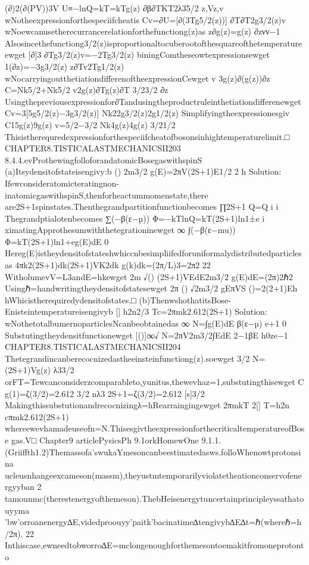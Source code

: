 {{{{{{{{{{{(∂)2(∂(PV))3V
U≡−lnQ=kT=kTg(z)
∂β∂TKT2λ35/2
z,Vz,v
wNotheexpressionforthespeciifcheatis
Cv=∂U=[∂(3Tg5/2(z))]
∂T∂T2g3/2(z)v
wNoewcanusetherecurrancerelationforthefunctiong(z)as
z∂g(z)=g(z)
∂zνν−1
Alsosincethefunctiong3/2(z)isproportionaltocuberootofthesquareofthetemperatureewget
[∂]3
∂Tg3/2(z)v=−2Tg3/2(z)
biningComtheseowtexpressionsewget
1(∂z)=−3g3/2(z)
z∂Tv2Tg1/2(z)
wNocarryingoutthetiationdifferenoftheexpressionCewget
v
3g(z)∂(g(z))∂z
C=Nk5/2+Nk5/2
v2g(z)∂Tg(z)∂T
3/23/2
∂z
Usingthepreviousexpressionfor∂Tandusingtheproductruleinthetiationdifferenewget
Cv=3[5g5/2(z)−3g3/2(z)]
Nk22g3/2(z)2g1/2(z)
Simplifyingtheexpressionesgiv
C15g(z)9g(z)
v=5/2−3/2
Nk4g(z)4g(z)
3/21/2
Thisistherequredexpressionforthespeciifcheatofbosonsinhightemperaturelimit.□
CHAPTER8.TISTICALASTMECHANICSII203
8.4.4.evProthewingfolloforandatomicBosegaswithspinS
(a)Itsydensitofstateisengivy:b
()
2m3/2
g(E)=2πV(2S+1)E1/2
2
h
Solution:
Ifewconsideratomicteratingnon-inatomicgaswithspinS,thenforheactummomenstate,there
are2S+1spinstates.Thenthegrandpartitionfunctionbecomes
∏2S+1
Q=Q
i
i
Thegrandptialotenbecomes
∑(−β(ε−µ))
Φ=−kTlnQ=kT(2S+1)ln1±e
i
ximatingApprothesumwiththetegrationinewget
∞
∫(−β(ε−mu))
Φ=kT(2S+1)ln1+eg(E)dE
0
Hereg(E)istheydensitofstateshwhiccnbesimpliifedforuniformalydistributedparticlesas
4πk2(2S+1)dk(2S+1)VK2dk
g(k)dk=(2π/L)3=2π2
22
WitholumevV=L3andE=hkewget
2m
√()
(2S+1)VEdE2m3/2
g(E)dE=(2π)2ℏ2
Usingℏ=handwritingtheydensitofstatesewget
2π
()
√2m3/2
gEπVS
()=2(2+1)Eh
hWhicistherequiredydensitofstates.□
(b)ThenwshothatitsBose-Enisteintemperatureisengivyb
[]
h2n2/3
Tc=2πmk2.612(2S+1)
Solution:
wNothetotalbumernoparticlesNcanbeobtainedas
∞
N=∫g(E)dE
β(ε−µ)
e+1
0
Substutingtheydensitfunctionewget
[()]∞√
N=2πV2m3/2∫EdE
2−1βE
h0ze−1
CHAPTER8.TISTICALASTMECHANICSII204
Thetegrandincanberecocnizedastheeinsteinfunctiong(z).soewget
3/2
N=(2S+1)Vg(z)
λ33/2
orFT=Tewcanconsiderzcomparableto,yunitus,thewevhaz=1,substutingthisewget
C
g(1)=ζ(3/2)=2.612
3/2
nλ3
2S+1=ζ(3/2)=2.612
[s]3/2
Makingthissubstutionandrecocnizingλ=hRearraingingewget
2πmkT
2[]
T=h2n
cπmk2.612(2S+1)
whereewevhamadeuseofn=N.ThisesgivtheexpressionforthecriticaltemperatureofBose
gas.V□
Chapter9
articlePysicsPh
9.1orkHomewOne
9.1.1.(Griiffth1.2)Themassofa’swukaYmesoncanbeestimatedasws.folloWhenowtprotonsina
ucleusnhangeexcameson(massm),theyustmtemporarilyviolatetheationconservofenergyyban
2
tamounmc(therestenergyofthemeson).ThebHeisenergytuncertainprincipleyssathatouyyma
’bw’orroanenergy∆E,videdproouyy’paitk’bacinatime∆tengivyb∆E∆t=ℏ(whereℏ=h/2π).
22
Inthiscase,ewneedtobworro∆E=mclongenoughforthemesontoemakitfromoneprotonto
}}}}}}}}}}}
